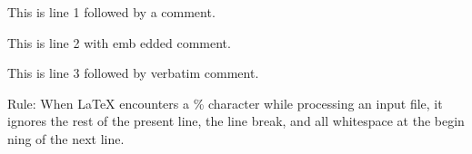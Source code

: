 \documentclass{article}
\begin{document}
This is line 1 followed by a comment. %

This is line 2 with emb%
                       edded comment.

This is line 3 followed by verbatim comment.

\begin{comment}
Comment line 1.
Comment line 2.
\end{comment}

Rule: When \LaTeX{} encounters a \% character while processing an input
file, it ignores the rest of the present line, the line break, and all
whitespace at the begin%
    ning of the next line.
\end{document}
